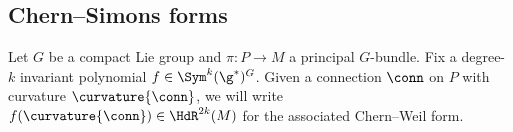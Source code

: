 %
%
%


\subsection{Chern--Simons forms}
\label{ssec:lens_CS}

Let $G$ be a compact Lie group and $\pi\colon P\rightarrow M$ a principal $G$-bundle. 
Fix a degree-$k$ invariant polynomial $f \in\Sym^k(\g^*)^G$. Given a connection $\conn$ on $P$ with
curvature $\curvature{\conn}$, we will write $f(\curvature{\conn})\in \HdR^{2k}(M)$ for the associated Chern--Weil form.

